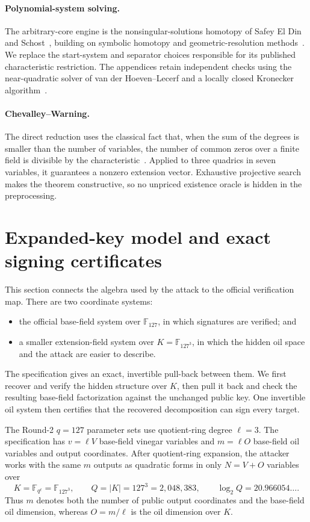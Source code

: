 \documentclass[11pt,a4paper]{article}
\theoremstyle{definition}
\theoremstyle{remark}
\newcommand{\F}{\mathbb F}
\begin{document}
\paragraph{Polynomial-system solving.}
The arbitrary-core engine is the nonsingular-solutions homotopy of Safey El
Din and Schost~\cite{SafeySchost2018}, building on symbolic homotopy and
geometric-resolution methods~\cite{Schost2003,GiustiLecerfSalvy2001}.  We
replace the start-system and separator choices responsible for its published
characteristic restriction.  The appendices retain independent checks using
the near-quadratic solver of van der Hoeven--Lecerf and a locally closed
Kronecker algorithm~\cite{vdHL,Gimenez2026}.

\paragraph{Chevalley--Warning.}
The direct reduction uses the classical fact that, when the sum of the degrees
is smaller than the number of variables, the number of common zeros over a
finite field is divisible by the characteristic~\cite{Chevalley1935,Warning1935}.
Applied to three quadrics in seven variables, it guarantees a nonzero extension
vector.  Exhaustive projective search makes the theorem constructive, so no
unpriced existence oracle is hidden in the preprocessing.

\section{Expanded-key model and exact signing certificates}\label{sec:model}

This section connects the algebra used by the attack to the official verification map.  There are two coordinate systems:
\begin{itemize}
\item the official base-field system over $\F_{127}$, in which signatures are verified; and
\item a smaller extension-field system over $K=\F_{127^3}$, in which the hidden oil space and the attack are easier to describe.
\end{itemize}
The specification gives an exact, invertible pull-back between them.  We first recover and verify the hidden structure over $K$, then pull it back and check the resulting base-field factorization against the unchanged public key.  One invertible oil system then certifies that the recovered decomposition can sign every target.

The Round-2 $q=127$ parameter sets use quotient-ring degree $\ell=3$.  The specification has $v=\ell V$ base-field vinegar variables and $m=\ell O$ base-field oil variables and output coordinates.  After quotient-ring expansion, the attacker works with the same $m$ outputs as quadratic forms in only $N=V+O$ variables over
\[
K=\F_{q^\ell}=\F_{127^3},\qquad Q=|K|=127^3=2{,}048{,}383,
\qquad \log_2 Q=20.966054\ldots.
\]
Thus $m$ denotes both the number of public output coordinates and the base-field oil dimension, whereas $O=m/\ell$ is the oil dimension over $K$.
\end{document}
